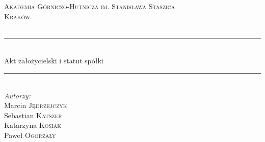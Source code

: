 \documentclass[a4paper, 11pt]{article}
\begin{document}
	
	\begin{titlepage}
	
	
		
		\newcommand{\HRule}{\rule{\linewidth}{0.5mm}} %
		
		\center %
		
		
		\textsc{\LARGE Akademia Górniczo-Hutnicza im. Stanisława Staszica}\\[1.5cm] %
		\textsc{\Large Kraków}\\[0.5cm] %
		\textsc{\large }\\[0.5cm] %
		
		
		\HRule \\[0.4cm]
		{\fontsize{38}{50}\selectfont Akt założycielski i statut spółki}
		\HRule \\[1.5cm]
		
		
		\Large \emph{Autorzy:}\\
		Marcin \textsc{Jędrzejczyk}\\ %
		Sebastian \textsc{Katszer}\\ %
		Katarzyna \textsc{Kosiak} \\ %
		Paweł	  \textsc{Ogorzały} \\ [3cm]\


\end{titlepage}
\end{document}
